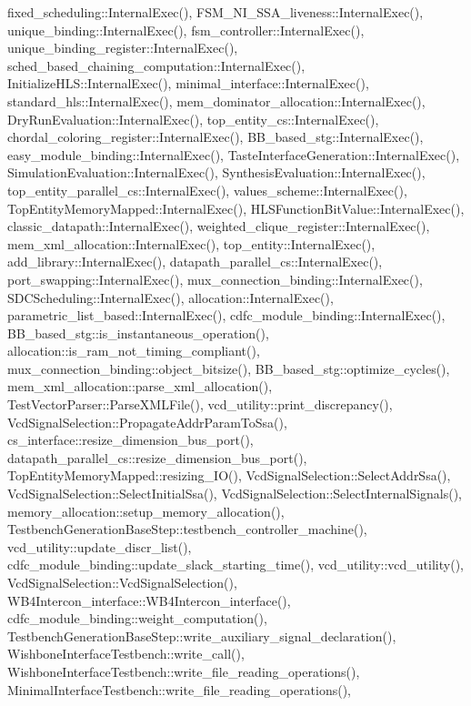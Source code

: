 fixed\+\_\+scheduling\+::\+Internal\+Exec(), F\+S\+M\+\_\+\+N\+I\+\_\+\+S\+S\+A\+\_\+liveness\+::\+Internal\+Exec(), unique\+\_\+binding\+::\+Internal\+Exec(), fsm\+\_\+controller\+::\+Internal\+Exec(), unique\+\_\+binding\+\_\+register\+::\+Internal\+Exec(), sched\+\_\+based\+\_\+chaining\+\_\+computation\+::\+Internal\+Exec(), Initialize\+H\+L\+S\+::\+Internal\+Exec(), minimal\+\_\+interface\+::\+Internal\+Exec(), standard\+\_\+hls\+::\+Internal\+Exec(), mem\+\_\+dominator\+\_\+allocation\+::\+Internal\+Exec(), Dry\+Run\+Evaluation\+::\+Internal\+Exec(), top\+\_\+entity\+\_\+cs\+::\+Internal\+Exec(), chordal\+\_\+coloring\+\_\+register\+::\+Internal\+Exec(), B\+B\+\_\+based\+\_\+stg\+::\+Internal\+Exec(), easy\+\_\+module\+\_\+binding\+::\+Internal\+Exec(), Taste\+Interface\+Generation\+::\+Internal\+Exec(), Simulation\+Evaluation\+::\+Internal\+Exec(), Synthesis\+Evaluation\+::\+Internal\+Exec(), top\+\_\+entity\+\_\+parallel\+\_\+cs\+::\+Internal\+Exec(), values\+\_\+scheme\+::\+Internal\+Exec(), Top\+Entity\+Memory\+Mapped\+::\+Internal\+Exec(), H\+L\+S\+Function\+Bit\+Value\+::\+Internal\+Exec(), classic\+\_\+datapath\+::\+Internal\+Exec(), weighted\+\_\+clique\+\_\+register\+::\+Internal\+Exec(), mem\+\_\+xml\+\_\+allocation\+::\+Internal\+Exec(), top\+\_\+entity\+::\+Internal\+Exec(), add\+\_\+library\+::\+Internal\+Exec(), datapath\+\_\+parallel\+\_\+cs\+::\+Internal\+Exec(), port\+\_\+swapping\+::\+Internal\+Exec(), mux\+\_\+connection\+\_\+binding\+::\+Internal\+Exec(), S\+D\+C\+Scheduling\+::\+Internal\+Exec(), allocation\+::\+Internal\+Exec(), parametric\+\_\+list\+\_\+based\+::\+Internal\+Exec(), cdfc\+\_\+module\+\_\+binding\+::\+Internal\+Exec(), B\+B\+\_\+based\+\_\+stg\+::is\+\_\+instantaneous\+\_\+operation(), allocation\+::is\+\_\+ram\+\_\+not\+\_\+timing\+\_\+compliant(), mux\+\_\+connection\+\_\+binding\+::object\+\_\+bitsize(), B\+B\+\_\+based\+\_\+stg\+::optimize\+\_\+cycles(), mem\+\_\+xml\+\_\+allocation\+::parse\+\_\+xml\+\_\+allocation(), Test\+Vector\+Parser\+::\+Parse\+X\+M\+L\+File(), vcd\+\_\+utility\+::print\+\_\+discrepancy(), Vcd\+Signal\+Selection\+::\+Propagate\+Addr\+Param\+To\+Ssa(), cs\+\_\+interface\+::resize\+\_\+dimension\+\_\+bus\+\_\+port(), datapath\+\_\+parallel\+\_\+cs\+::resize\+\_\+dimension\+\_\+bus\+\_\+port(), Top\+Entity\+Memory\+Mapped\+::resizing\+\_\+\+I\+O(), Vcd\+Signal\+Selection\+::\+Select\+Addr\+Ssa(), Vcd\+Signal\+Selection\+::\+Select\+Initial\+Ssa(), Vcd\+Signal\+Selection\+::\+Select\+Internal\+Signals(), memory\+\_\+allocation\+::setup\+\_\+memory\+\_\+allocation(), Testbench\+Generation\+Base\+Step\+::testbench\+\_\+controller\+\_\+machine(), vcd\+\_\+utility\+::update\+\_\+discr\+\_\+list(), cdfc\+\_\+module\+\_\+binding\+::update\+\_\+slack\+\_\+starting\+\_\+time(), vcd\+\_\+utility\+::vcd\+\_\+utility(), Vcd\+Signal\+Selection\+::\+Vcd\+Signal\+Selection(), W\+B4\+Intercon\+\_\+interface\+::\+W\+B4\+Intercon\+\_\+interface(), cdfc\+\_\+module\+\_\+binding\+::weight\+\_\+computation(), Testbench\+Generation\+Base\+Step\+::write\+\_\+auxiliary\+\_\+signal\+\_\+declaration(), Wishbone\+Interface\+Testbench\+::write\+\_\+call(), Wishbone\+Interface\+Testbench\+::write\+\_\+file\+\_\+reading\+\_\+operations(), Minimal\+Interface\+Testbench\+::write\+\_\+file\+\_\+reading\+\_\+operations(), 